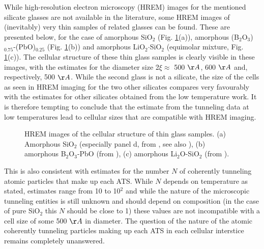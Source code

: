 \documentclass[10pt]{article}
\begin{document}
While high-resolution electron microscopy (HREM) images for the mentioned
silicate glasses are not available in the literature, some HREM images of (inevitably)
very thin samples of related glasses can be found. These are presented below, 
for the case of amorphous SiO$_2$ (Fig. \ref{cellfig}(a)), amorphous 
(B$_2$O$_3$)$_{0.75}$-(PbO)$_{0.25}$ (Fig. \ref{cellfig}(b)) and amorphous
LiO$_2$$\cdot$SiO$_2$ (equimolar mixture, Fig. \ref{cellfig}(c)). The cellular 
structure of these thin glass samples is clearly visible in these images, with the 
estimates for the diameter size 2$\xi\approx$ 500 $\AA$, 600 $\AA$ and, 
respectively, 500 $\AA$. While the second glass is not a silicate, the size of the 
cells as seen in HREM imaging for the two other silicates compares very favourably
with the estimates for other silicates obtained from the low temperature work.
It is therefore tempting to conclude that the estimate from the tunneling data at
low temperatures lead to cellular sizes that are compatible with HREM imaging.
\begin{figure}[h!]
\centering
      \vskip 20mm
\caption{HREM images of the cellular structure of thin glass samples. (a) Amorphous
SiO$_2$ (especially panel d, from \cite{Zar1}, see also \cite{Zar2}), 
(b) amorphous B$_2$O$_3$-PbO (from \cite{Zar2}), (c) amorphous Li$_2$O-SiO$_2$ 
(from \cite{Vogel}). }
\label{cellfig}
\end{figure}
This is also consistent with estimates for the number $N$ of coherently tunneling
atomic particles that make up each ATS. While $N$ depends on temperature as
stated, estimates \cite{Pal2011} range from 10 to 10$^2$ and while the nature of 
the microscopic tunneling entities is still unknown and should depend on composition 
(in the case of pure SiO$_2$ this $N$ should be close to 1) these values are not 
incompatible with a cell size of some 500 $\AA$ in diameter. The question of the 
nature of the atomic coherently tunneling particles making up each ATS in each 
cellular interstice remains completely unanswered.
\end{document}
